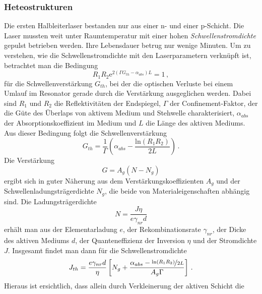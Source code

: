 \subsubsection{Heteostrukturen}\label{heterostrukturen}
Die ersten Halbleiterlaser bestanden nur aus einer n- und einer
p-Schicht. Die Laser mussten weit unter Raumtemperatur mit einer hohen
\textit{Schwellenstromdichte} gepulst betrieben werden. Ihre Lebensdauer betrug
nur wenige Minuten. Um zu verstehen, wie die Schwellenstromdichte mit den
Laserparametern verknüpft ist, betrachtet man die Bedingung
\begin{equation}\label{eq:schwellenbedingung}
	R_1R_2\mathrm{e}^{2\left(\Gamma G_{th}-\alpha_{abs}\right)L}=1\,,
\end{equation}
für die Schwellenverstärkung $G_{th}$, bei der die optischen Verluste bei einem
Umlauf im Resonator gerade durch die Verstärkung ausgeglichen werden.
Dabei sind $R_1$ und $R_2$ die Reflektivitäten der Endspiegel, $\Gamma$ der
Confinement-Faktor, der die Güte des Überlaps von aktivem Medium und
Stehwelle charakterisiert, $\alpha_{abs}$ der Absorptionskoeffizient im
Medium und $L$ die Länge des aktiven Mediums. Aus dieser Bedingung folgt die
Schwellenverstärkung
\begin{equation}\label{eq:schwellenverstärkung}
	G_{th}=\frac{1}{\Gamma}\left(\alpha_{abs}-\frac{\mathrm{ln}{(R_1R_2)}}{2L}\right)\,.
\end{equation}
Die Verstärkung
\begin{equation}\label{eq:laser-verstärkung}
	G=A_g\left(N-N_g\right)
\end{equation}
ergibt sich in guter Näherung aus dem Verstärkungskoeffizienten $A_g$ und der
Schwellenladungsträgerdichte $N_g$, die beide von Materialeigenschaften abhängig
sind. Die Ladungsträgerdichte
\begin{equation}\label{eq:ladungstraegerdichte}
	N=\frac{J\eta}{e\gamma_{nr}d}
\end{equation}
erhält man aus der Elementarladung $e$, der Rekombinationsrate $\gamma_{nr}$,
der Dicke des aktiven Mediums $d$, der Quanteneffizienz der Inversion $\eta$ und der
Stromdichte $J$. Insgesamt findet man dann für die Schwellenstromdichte
\begin{equation}\label{eq:schwellenstromdichte}
	J_{th}=\frac{e\gamma_{nr}d}{\eta}\left[N_g+\frac{\alpha_{abs}-\nicefrac{\mathrm{ln}{\left(R_1R_2\right)}}{2L}}{A_g\Gamma}\right]\,.
\end{equation}
Hieraus ist ersichtlich, dass allein durch Verkleinerung der aktiven Schicht die
